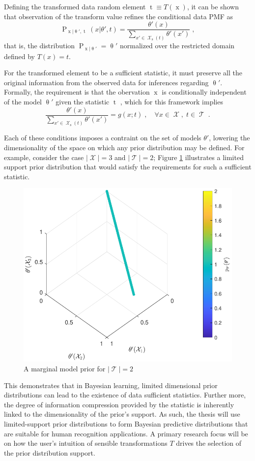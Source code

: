 \documentclass[12pt]{report}
\DeclareMathOperator{\xrm}{\mathrm{x}}
\DeclareMathOperator{\srm}{\mathrm{s}}
\DeclareMathOperator{\trm}{\mathrm{t}}
\DeclareMathOperator{\Prm}{\mathrm{P}}
\DeclareMathOperator{\Xcal}{\mathcal{X}}
\DeclareMathOperator{\Tcal}{\mathcal{T}}
\begin{document}
Defining the transformed data random element $\trm \equiv T(\xrm)$, it can be shown that observation of the transform value refines the conditional data PMF as
\begin{equation}
\Prm_{\xrm | \uptheta',\trm}(x | \theta',t) = \frac{\theta'(x)}{\sum_{x' \in \Xcal_{\srm}(t)} \theta'(x')} \;,
\end{equation}
that is, the distribution $\Prm_{\xrm | \uptheta'}= \uptheta'$ normalized over the restricted domain defined by $T(x) = t$. 

For the transformed element to be a sufficient statistic, it must preserve all the original information from the observed data for inferences regarding $\uptheta'$. Formally, the requirement is that the obervation $\xrm$ is conditionally independent of the model $\uptheta'$ given the statistic $\trm$ \cite{kay-est}, which for this framework implies 
\begin{equation}
\frac{\theta'(x)}{\sum_{x' \in \Xcal_{\srm}(t)} \theta'(x')} = g(x;t) \;, \quad \forall x \in \Xcal, \; t \in \Tcal \;.
\end{equation}

Each of these conditions imposes a contraint on the set of models $\theta'$, lowering the dimensionality of the space on which any prior distribution may be defined. For example, consider the case $|\Xcal| = 3$ and $|\Tcal| = 2$; Figure \ref{fig:P_theta_suff_stat} illustrates a limited support prior distribution that would satisfy the requirements for such a sufficient statistic. 
\begin{figure}
\centering
\includegraphics[width=0.6\linewidth]{P_theta_suff_stat.pdf}
\caption{A marginal model prior for $|\Tcal| = 2$}
\label{fig:P_theta_suff_stat}
\end{figure}
This demonstrates that in Bayesian learning, limited dimensional prior distributions can lead to the existence of data sufficient statistics. Further more, the degree of information compression provided by the statistic is inherently linked to the dimensionality of the prior's support. As such, the thesis will use limited-support prior distributions to form Bayesian predictive distributions that are suitable for human recognition applications. A primary research focus will be on how the user's intuition of sensible transformations $T$ drives the selection of the prior distribution support.
\end{document}
